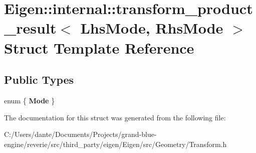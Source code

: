 \hypertarget{struct_eigen_1_1internal_1_1transform__product__result}{}\section{Eigen\+::internal\+::transform\+\_\+product\+\_\+result$<$ Lhs\+Mode, Rhs\+Mode $>$ Struct Template Reference}
\label{struct_eigen_1_1internal_1_1transform__product__result}
\subsection*{Public Types}
\begin{DoxyCompactItemize}
\item 
\mbox{\label{struct_eigen_1_1internal_1_1transform__product__result_a511838b96e0b88c1fca00415937683f4}} 
enum \{ {\bfseries Mode}
 \}
\end{DoxyCompactItemize}


The documentation for this struct was generated from the following file\+:\begin{DoxyCompactItemize}
\item 
C\+:/\+Users/dante/\+Documents/\+Projects/grand-\/blue-\/engine/reverie/src/third\+\_\+party/eigen/\+Eigen/src/\+Geometry/Transform.\+h\end{DoxyCompactItemize}
